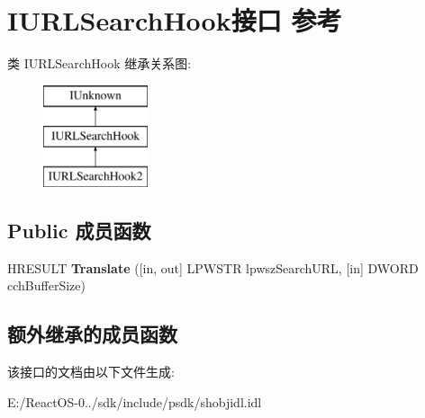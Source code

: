 \hypertarget{interface_i_u_r_l_search_hook}{}\section{I\+U\+R\+L\+Search\+Hook接口 参考}
\label{interface_i_u_r_l_search_hook}
类 I\+U\+R\+L\+Search\+Hook 继承关系图\+:\begin{figure}[H]
\begin{center}
\leavevmode
\includegraphics[height=3.000000cm]{interface_i_u_r_l_search_hook}
\end{center}
\end{figure}
\subsection*{Public 成员函数}
\begin{DoxyCompactItemize}
\item 
\mbox{\label{interface_i_u_r_l_search_hook_ab34d582dbd4c297640bba6761df76f64}} 
H\+R\+E\+S\+U\+LT {\bfseries Translate} (\mbox{[}in, out\mbox{]} L\+P\+W\+S\+TR lpwsz\+Search\+U\+RL, \mbox{[}in\mbox{]} D\+W\+O\+RD cch\+Buffer\+Size)
\end{DoxyCompactItemize}
\subsection*{额外继承的成员函数}


该接口的文档由以下文件生成\+:\begin{DoxyCompactItemize}
\item 
E\+:/\+React\+O\+S-\/0../sdk/include/psdk/shobjidl.\+idl\end{DoxyCompactItemize}

